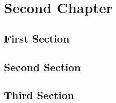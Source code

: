 \chapter{Second Chapter}


\section{First Section}

\section{Second Section}

\section{Third Section}